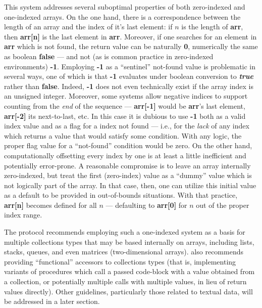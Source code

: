 \documentclass[12pt,letterpaper]{article}
\newcommand{\HGDM}{\resizebox{!}{7.5pt}{\ATexttclr{HGDM}}}
\newcommand{\lHGDM}{\resizebox{!}{8.5pt}{\ATexttclr{H}}%
\resizebox{!}{7.5pt}{\ATexttclr{GDM}}}
\newcommand{\ATexttclr}[1]{\textcolor{tcolor}{\textbf{#1}}}
\newcommand{\p}[1]{

\vspace{.7em}#1}
\newcommand{\q}[1]{{\fontfamily{qcr}\selectfont ``}#1{\fontfamily{qcr}\selectfont ''}}
\begin{document}
{\p{This system addresses several suboptimal properties 
of both zero-indexed and one-indexed arrays.  On the 
one hand, there is a correspondence between the 
length of an array and the index of it's last element: 
if $n$ is the length of \textbf{arr}, then \textbf{arr[n]} 
is the last element in \textbf{arr}.  Moreover, if one searches 
for an element in \textbf{arr} which is not found, the 
return value can be naturally \textbf{0}, numerically 
the same as boolean \textbf{false} --- and not (as is 
common practice in zero-indexed environments) \textbf{-1}.  
Employing \textbf{-1} as a \q{sentinel} not-found value 
is problematic in several ways, one of which is that 
\textbf{-1} evaluates under boolean conversion to 
\textbf{\textit{true}} rather than \textbf{false}.   
Indeed, \textbf{-1} does not even technically 
exist if the array index is an unsigned integer.  
Moreover, some systems allow negative indices to 
support counting from the \textit{end} of the sequence 
--- \textbf{arr[-1]} would be \textbf{arr}'s last 
element, \textbf{arr[-2]} its next-to-last, etc.  
In this case it is dubious to use \textbf{-1} both 
as a valid index value and as a flag for a index 
not found --- i.e., for the \textit{lack} of any 
index which returns a value that would satisfy some 
condition.  With any logic, the proper 
flag value for a \q{not-found} condition would be zero.  
On the other hand, computationally offsetting every 
index by one is at least a little inefficient 
and potentially error-prone.  A reasonable compromise 
is to leave an array internally zero-indexed, but 
treat the first (zero-index) value as a \q{dummy} 
value which is not logically part of the array.  
In that case, then, one can utilize this initial value 
as a default to be provided in out-of-bounds situations.  
With that practice, \textbf{arr[n]} becomes defined for 
all $n$ --- defaulting to \textbf{arr[0]} for $n$ 
out of the proper index range.}

\p{The \HGDM{} protocol recommends employing such a one-indexed system 
as a basis for multiple collections types that 
may be based internally on arrays, including lists, 
stacks, queues, and even matrices (two-dimensional 
arrays).  \lHGDM{} also recommends 
providing \q{functional} accessors to collections 
types (that is, implementing variants of procedures 
which call a passed code-block with a value 
obtained from a collection, or potentially multiple 
calls with multiple values, in lieu of return 
values directly).  Other guidelines, particularly 
those related to textual data, will be addressed 
in a later section.

}}
\end{document}

